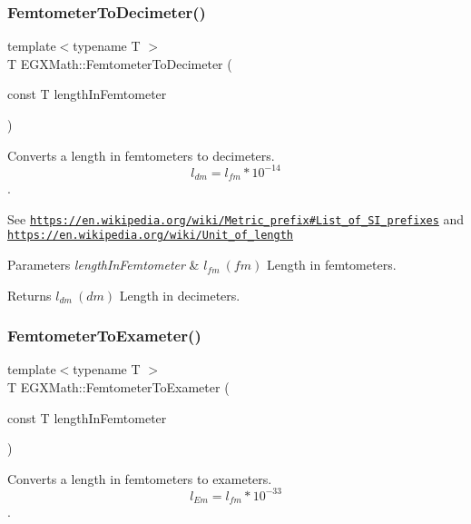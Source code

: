 \subsubsection{\texorpdfstring{Femtometer\+To\+Decimeter()}{FemtometerToDecimeter()}}
{\footnotesize\ttfamily template$<$typename T $>$ \\
T E\+G\+X\+Math\+::\+Femtometer\+To\+Decimeter (\begin{DoxyParamCaption}\item[{const T}]{length\+In\+Femtometer }\end{DoxyParamCaption})}



Converts a length in femtometers to decimeters. \[ l_{dm}=l_{fm} * 10^{-14} \]. 

See \href{https://en.wikipedia.org/wiki/Metric_prefix#List_of_SI_prefixes}{\tt https\+://en.\+wikipedia.\+org/wiki/\+Metric\+\_\+prefix\#\+List\+\_\+of\+\_\+\+S\+I\+\_\+prefixes} and \href{https://en.wikipedia.org/wiki/Unit_of_length}{\tt https\+://en.\+wikipedia.\+org/wiki/\+Unit\+\_\+of\+\_\+length} 
\begin{DoxyParams}{Parameters}
{\em length\+In\+Femtometer} & $ l_{fm}\ (fm)$ Length in femtometers. \\
\hline
\end{DoxyParams}
\begin{DoxyReturn}{Returns}
$ l_{dm}\ (dm)$ Length in decimeters. 
\end{DoxyReturn}
\mbox{\label{group___e_g_x_math-_conversions-_length_conversions-_s_i-_femtometer-_s_i_ga44f78ba3f928c765acf6330b47ab3827}} 
\subsubsection{\texorpdfstring{Femtometer\+To\+Exameter()}{FemtometerToExameter()}}
{\footnotesize\ttfamily template$<$typename T $>$ \\
T E\+G\+X\+Math\+::\+Femtometer\+To\+Exameter (\begin{DoxyParamCaption}\item[{const T}]{length\+In\+Femtometer }\end{DoxyParamCaption})}



Converts a length in femtometers to exameters. \[ l_{Em}=l_{fm} * 10^{-33} \]. 

